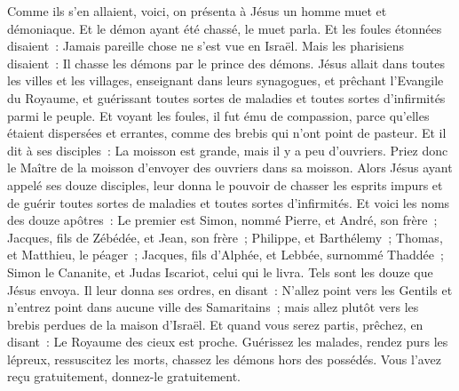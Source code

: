 \begin{multicols}{2}
Comme ils s'en allaient, voici, on présenta à Jésus un homme muet et démoniaque.
Et le démon ayant été chassé, le muet parla. Et les foules étonnées disaient~: Jamais pareille chose ne s'est vue en Israël.
Mais les pharisiens disaient~: Il chasse les démons par le prince des démons.
Jésus allait dans toutes les villes et les villages, enseignant dans leurs synagogues, et prêchant l'Evangile du Royaume, et guérissant toutes sortes de maladies et toutes sortes d'infirmités parmi le peuple.
Et voyant les foules, il fut ému de compassion, parce qu'elles étaient dispersées et errantes, comme des brebis qui n'ont point de pasteur.
Et il dit à ses disciples~: La moisson est grande, mais il y a peu d'ouvriers.
Priez donc le Maître de la moisson d'envoyer des ouvriers dans sa moisson.
\VerseOne{}Alors Jésus ayant appelé ses douze disciples, leur donna le pouvoir de chasser les esprits impurs et de guérir toutes sortes de maladies et toutes sortes d'infirmités.
Et voici les noms des douze apôtres~: Le premier est Simon, nommé Pierre, et André, son frère~; Jacques, fils de Zébédée, et Jean, son frère~;
Philippe, et Barthélemy~; Thomas, et Matthieu, le péager~; Jacques, fils d'Alphée, et Lebbée, surnommé Thaddée~;
Simon le Cananite, et Judas Iscariot, celui qui le livra.
Tels sont les douze que Jésus envoya. Il leur donna ses ordres, en disant~: N'allez point vers les Gentils et n'entrez point dans aucune ville des Samaritains~;
mais allez plutôt vers les brebis perdues de la maison d'Israël.
Et quand vous serez partis, prêchez, en disant~: Le Royaume des cieux est proche.
Guérissez les malades, rendez purs les lépreux, ressuscitez les morts, chassez les démons hors des possédés. Vous l'avez reçu gratuitement, donnez-le gratuitement.

\end{multicols}
